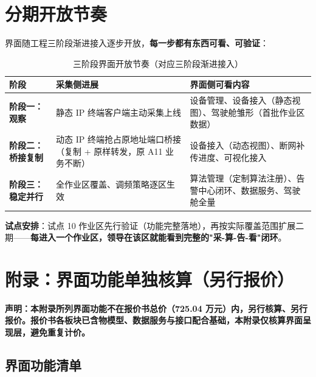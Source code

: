 \documentclass[11pt,a4paper]{ctexart}
\begin{document}
\section{分期开放节奏}

界面随工程三阶段渐进接入逐步开放，\textbf{每一步都有东西可看、可验证}：

\begin{table}[H]\centering
\caption{三阶段界面开放节奏（对应三阶段渐进接入）}
\begin{tabular}{p{2.2cm} p{5.6cm} p{6.0cm}}
\toprule
\textbf{阶段} & \textbf{采集侧进展} & \textbf{界面侧可看内容} \\
\midrule
\textbf{阶段一：观察} & 静态 IP 终端客户端主动采集上线 & 设备管理、设备接入（静态视图）、驾驶舱雏形（首批作业区数据） \\
\textbf{阶段二：桥接复制} & 动态 IP 终端抢占原地址端口桥接（复制 + 原样转发，原 A11 业务不断） & 设备接入（动态视图）、断网补传进度、可视化接入 \\
\textbf{阶段三：稳定并行} & 全作业区覆盖、调频策略逐区生效 & 算法管理（定制算法注册）、告警中心闭环、数据服务、驾驶舱全量 \\
\bottomrule
\end{tabular}
\end{table}

\textbf{试点安排}：试点 10 作业区先行验证（功能完整落地），再按实际覆盖范围扩展二期——\textbf{每进入一个作业区，领导在该区就能看到完整的"采-算-告-看"闭环}。

\section{附录：界面功能单独核算（另行报价）}

{\small\bfseries\color{red!70!black} 声明：本附录所列界面功能不在报价书总价（725.04 万元）内，另行核算、另行报价。报价书各板块已含物模型、数据服务与接口配合基础，本附录仅核算界面呈现层，避免重复计价。}

\subsection{界面功能清单}
\end{document}
